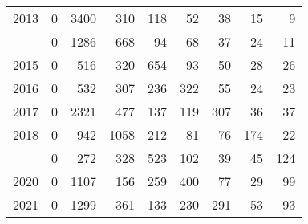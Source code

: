 \documentclass[
]{article}
\begin{document}
\begin{longtable}[t]{lrrrrrrrr}
2013 & 0 & 3400 & 310 & 118 & 52 & 38 & 15 & 9\\
\addlinespace
2014 & 0 & 1286 & 668 & 94 & 68 & 37 & 24 & 11\\
2015 & 0 & 516 & 320 & 654 & 93 & 50 & 28 & 26\\
2016 & 0 & 532 & 307 & 236 & 322 & 55 & 24 & 23\\
2017 & 0 & 2321 & 477 & 137 & 119 & 307 & 36 & 37\\
2018 & 0 & 942 & 1058 & 212 & 81 & 76 & 174 & 22\\
\addlinespace
2019 & 0 & 272 & 328 & 523 & 102 & 39 & 45 & 124\\
2020 & 0 & 1107 & 156 & 259 & 400 & 77 & 29 & 99\\
2021 & 0 & 1299 & 361 & 133 & 230 & 291 & 53 & 93\\*
\end{longtable}
\end{document}
